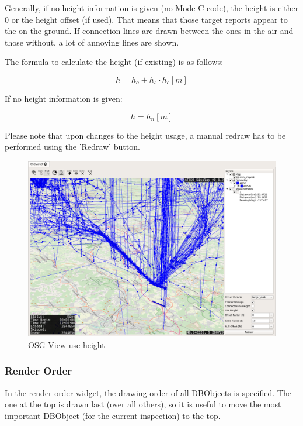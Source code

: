 {Generally, if no height information is given (no Mode C code), the height is either $0$ or the height offset (if used). That means that those target reports appear to the on the ground. If connection lines are drawn between the ones in the air and those without, a lot of annoying lines are shown.

The formula to calculate the height (if existing) is as follows:

$$ h = h_o + h_s \cdot h_c [m]$$ 

If no height information is given:

$$ h = h_n [m]$$ 

Please note that upon changes to the height usage, a manual redraw has to be performed using the 'Redraw' button.


\begin{figure}[H]
    \hspace*{-2cm}
    \includegraphics[width=18cm,frame]{../screenshots/osgview_use_height.png}
  \caption{OSG View use height}
\end{figure}

\subsubsection{Render Order}

In the render order widget, the drawing order of all DBObjects is specified. The one at the top is drawn last (over all others), so it is useful to move the most important DBObject (for the current inspection) to the top.

}
